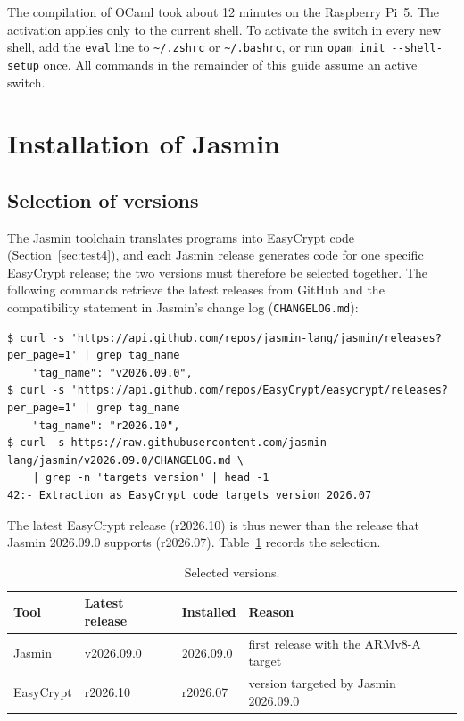 \documentclass[11pt,a4paper]{article}
\newcommand{\cmd}[1]{\lstinline[style=shell,frame=none]{#1}}
\newcommand{\file}[1]{\texttt{#1}}
\begin{document}
The compilation of OCaml took about 12 minutes on the Raspberry Pi~5. The
activation applies only to the current shell. To activate the switch in
every new shell, add the \texttt{eval} line to \file{\textasciitilde/.zshrc}
or \file{\textasciitilde/.bashrc}, or run \cmd{opam init --shell-setup}
once. All commands in the remainder of this guide assume an active switch.

\section{Installation of Jasmin}
\label{sec:jasmin}

\subsection{Selection of versions}

The Jasmin toolchain translates programs into EasyCrypt code
(Section~\ref{sec:test4}), and each Jasmin release generates code for one specific EasyCrypt release;
the two versions must therefore be selected together. The following commands
retrieve the latest releases from GitHub and the compatibility statement in
Jasmin's change log (\file{CHANGELOG.md}):

\begin{lstlisting}[style=shell]
$ curl -s 'https://api.github.com/repos/jasmin-lang/jasmin/releases?per_page=1' | grep tag_name
    "tag_name": "v2026.09.0",
$ curl -s 'https://api.github.com/repos/EasyCrypt/easycrypt/releases?per_page=1' | grep tag_name
    "tag_name": "r2026.10",
$ curl -s https://raw.githubusercontent.com/jasmin-lang/jasmin/v2026.09.0/CHANGELOG.md \
    | grep -n 'targets version' | head -1
42:- Extraction as EasyCrypt code targets version 2026.07
\end{lstlisting}

The latest EasyCrypt release (r2026.10) is thus newer than the release that
Jasmin 2026.09.0 supports (r2026.07). Table~\ref{tab:versions} records the
selection.

\begin{table}[h]
\centering
\begin{tabular}{@{}llll@{}}
\toprule
\textbf{Tool} & \textbf{Latest release} & \textbf{Installed} & \textbf{Reason} \\
\midrule
Jasmin    & v2026.09.0 & 2026.09.0 & first release with the ARMv8-A target \\
EasyCrypt & r2026.10   & r2026.07  & version targeted by Jasmin 2026.09.0 \\
\bottomrule
\end{tabular}
\caption{Selected versions.}
\label{tab:versions}
\end{table}
\end{document}
